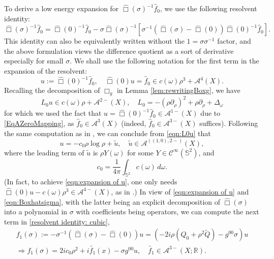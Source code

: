 \documentclass[10pt,a4paper,reqno]{amsart}
\newcommand{\CI}{\mathcal{C}^\infty}
\newcommand{\A}{\mathcal{A}}
\newcommand{\pa}{\partial}
\newcommand{\ti}{\tilde}
\renewcommand{\S}{{\mathbb S}}
\theoremstyle{definition}
\theoremstyle{remark}
\numberwithin{equation}{section}
\newcommand{\xo}{\omega}
\newcommand{\xs}{\sigma}
\newcommand{\R}{\mathbb R}
\newcommand{\wh}{\widehat}
\begin{document}
To derive a low energy expansion for $\wh\Box(\sigma)^{-1} \wh{f}_0$,
we use the following resolvent identity:
\begin{equation}
\label{resolvent identity: cubic}
    \wh\Box(\sigma)^{-1} \wh{f}_0 = \wh\Box(0)^{-1} \wh{f}_0 - \sigma \wh\Box(\sigma)^{-1} [\sigma^{-1} (\wh\Box(\sigma) - \wh\Box(0)) \wh\Box(0)^{-1} \wh{f}_0].
\end{equation}
This identity can also be equivalently written without the $1=\xs \xs^{-1}$ factor, and the above formulation views the difference quotient as a sort of derivative especially for small $\sigma$. We shall use the following notation for the first term in the expansion of the resolvent:
\[
    u:= \wh\Box(0)^{-1}\wh{f}_0,\quad \wh\Box(0) u = \wh{f}_0 \in c(\omega)\rho^3 + \A^4(X).
\]
Recalling the decomposition of $\Box_g$ in Lemma \ref{lem:rewritingBoxg}, we have
\begin{equation}
\label{eqn:L0u}
    L_0 u \in c(\omega) \rho + \A^{2-}(X), \quad L_0 = -(\rho\pa_\rho)^2 + \rho\pa_\rho + \Delta_\omega
\end{equation}
for which we used the fact that $u=\wh\Box(0)^{-1}\wh{f}_0\in \A^{1-}(X)$ due to \eqref{EqAZeroMapping}, as $\wh{f}_0 \in \A^3(X)$ (indeed, $\wh{f}_0 \in \A^{3-}(X)$ suffices). Following the same computation as in \cite[Lemma 3.3]{Hin22}, we can conclude from \eqref{eqn:L0u} that
\begin{equation}
\label{eqn:expansion of u}
    u = -c_0 \rho\log\rho + \ti u,\quad \ti u\in \A^{((1,0),2-)}(X),
\end{equation}
where the leading term of $\ti u$ is $\rho Y(\xo)$ for some $Y\in\CI(\mathbb{S}^2)$, and
\begin{equation}
\label{eqn:coefficient c0}
    c_0 = \frac{1}{4\pi} \int_{\S^2} c(\omega)\, d\omega .
\end{equation} 
(In fact, to achieve \eqref{eqn:expansion of u}, one only needs  $\wh\Box(0)u - c(\omega)\rho^3 \in \A^{4-}(X)$, as in \cite[Lemma 3.3]{Hin22}.) In view of \eqref{eqn:expansion of u} and \eqref{eqn:Boxhatsigma}, with the latter being an explicit decomposition of $\wh\Box(\xs)$ into a polynomial in $\xs$ with coefficients being operators, we can compute the next term in \cref*{resolvent identity: cubic},
\begin{equation}
\label{eqn:f_1(sigma)}
    \begin{gathered}
        f_1(\sigma) := -\sigma^{-1}(\wh\Box(\sigma) - \wh\Box(0)) u = (-2i\rho(Q_0 + \rho^2\widetilde{Q})-g^{00}\sigma)u \\
        \Rightarrow  f_1(\sigma) = 2ic_0 \rho^2 + i\ti{f_1}(x) - \sigma g^{00} u,\quad  \ti{f_1}\in \A^{3-}(X;\R).
    \end{gathered}
\end{equation} 
\end{document}
